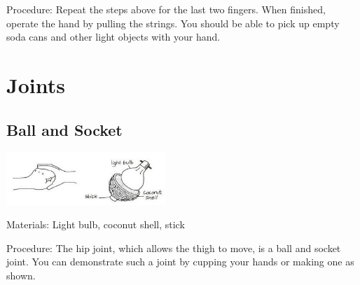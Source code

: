 \begin{multicols}{2}
\begin{description*}
\item[Procedure:]{Repeat the steps above for the last two fingers. When finished, operate the hand by pulling the strings. You should be able to pick up empty soda cans and other light objects with your hand.}
\end{description*}


\section*{Joints}


\subsection{Ball and Socket}

\begin{center}
\includegraphics[width=0.45\textwidth]{./img/vso/ball-socket.jpg}
\end{center}

\begin{description*}
\item[Materials:]{Light bulb, coconut shell, stick}
\item[Procedure:]{The hip joint, which allows the
thigh to move, is a ball and socket
joint. You can demonstrate such a
joint by cupping your hands or
making one as shown.}
\end{description*}


\end{multicols}
